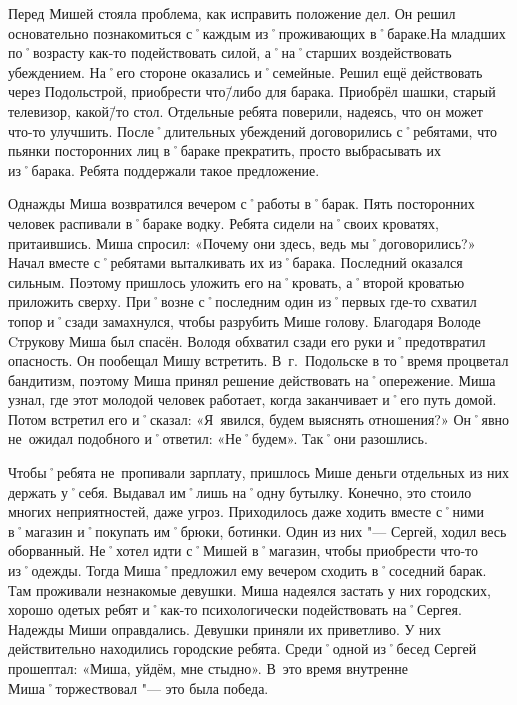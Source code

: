 Перед Мишей стояла проблема, как исправить положение дел. Он решил основательно познакомиться с˚каждым из˚проживающих в˚бараке.На младших по˚возрасту как-то подействовать силой, а˚на˚старших воздействовать убеждением. На˚его стороне оказались и˚семейные. Решил ещё действовать через Подольстрой, приобрести что\=/либо для барака. Приобрёл шашки, старый телевизор, какой\=/то стол. Отдельные ребята поверили, надеясь, что он может что-то улучшить. После˚длительных убеждений договорились с˚ребятами, что пьянки посторонних лиц в˚бараке прекратить, просто выбрасывать их из˚барака. Ребята поддержали такое предложение.

Однажды Миша возвратился вечером с˚работы в˚барак. Пять посторонних человек распивали в˚бараке водку. Ребята сидели на˚своих кроватях, притаившись. Миша спросил: «Почему они здесь, ведь мы˚договорились?» Начал вместе с˚ребятами выталкивать их из˚барака. Последний оказался сильным. Поэтому пришлось уложить его на˚кровать, а˚второй кроватью приложить сверху. При˚возне с˚последним один из˚первых где-то схватил топор и˚сзади замахнулся, чтобы разрубить Мише голову. Благодаря Володе Cтрукову Миша был спасён. Володя обхватил сзади его руки и˚предотвратил опасность. Он пообещал Мишу встретить. В~г.~Подольске в то˚время процветал бандитизм, поэтому Миша принял решение действовать на˚опережение. Миша узнал, где этот молодой человек работает, когда заканчивает и˚его путь домой. Потом встретил его и˚сказал: «Я~явился, будем выяснять отношения?» Он˚явно не~ожидал подобного и˚ответил: «Не˚будем». Так˚они разошлись.

Чтобы˚ребята не~пропивали зарплату, пришлось Мише деньги отдельных из них держать у˚себя. Выдавал им˚лишь на˚одну бутылку. Конечно, это стоило многих неприятностей, даже угроз. Приходилось даже ходить вместе с˚ними в˚магазин и˚покупать им˚брюки, ботинки. Один из них "--- Сергей, ходил весь оборванный. Не˚хотел идти с˚Мишей в˚магазин, чтобы приобрести что-то из˚одежды. Тогда Миша˚предложил ему вечером сходить в˚соседний барак. Там проживали незнакомые девушки. Миша надеялся застать у них городских, хорошо одетых ребят и˚как-то психологически подействовать на˚Сергея. Надежды Миши оправдались. Девушки приняли их приветливо. У них действительно находились городские ребята. Среди˚одной из˚бесед Сергей прошептал: «Миша, уйдём, мне стыдно». В~это время внутренне Миша˚торжествовал "--- это была победа.
\enlargethispage{-\baselineskip}		%
\pagebreak							%

